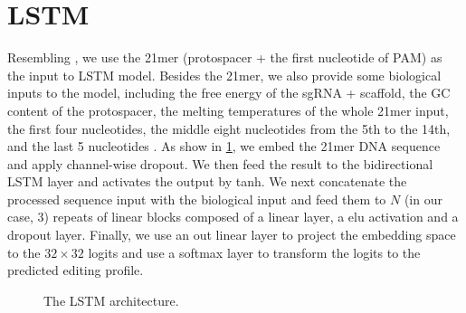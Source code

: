 \documentclass{article}
\begin{document}
\section{LSTM}

Resembling \cite{wang2019optimized}, we use the 21mer (protospacer + the first nucleotide of PAM) as the input to LSTM model. Besides the 21mer, we also provide some biological inputs to the model, including the free energy of the sgRNA + scaffold, the GC content of the protospacer, the melting temperatures of the whole 21mer input, the first four nucleotides, the middle eight nucleotides from the 5th to the 14th, and the last 5 nucleotides \cite{wang2019optimized}. As show in \cref{fig:lstm}, we embed the 21mer DNA sequence and apply channel-wise dropout. We then feed the result to the bidirectional LSTM layer and activates the output by tanh. We next concatenate the processed sequence input with the biological input and feed them to $N$ (in our case, 3) repeats of linear blocks composed of a linear layer, a elu activation and a dropout layer. Finally, we use an out linear layer to project the embedding space to the $32\times 32$ logits and use a softmax layer to transform the logits to the predicted editing profile.

\begin{figure}[H]
  \centering
\caption{The LSTM architecture.}\label{fig:lstm}
\end{figure}
\end{document}
